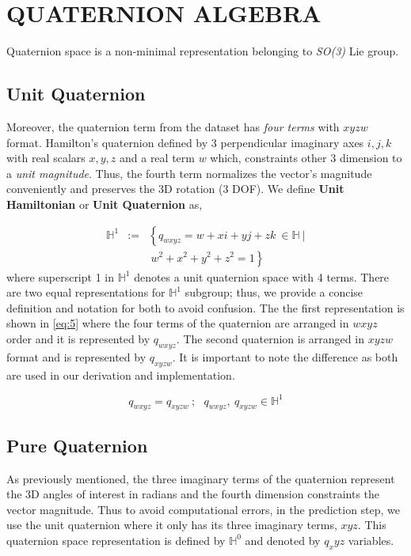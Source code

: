 \documentclass[letterpaper, 10 pt, conference]{ieeeconf}  %
\begin{document}
\section{QUATERNION ALGEBRA} \label{sec:QuatAlg}

Quaternion space is a non-minimal representation belonging to \textit{SO(3)} Lie group.

\subsection{Unit Quaternion}
Moreover, the quaternion term from the dataset has \textit{four terms} with $xyzw$
format.
Hamilton's quaternion defined by 3 perpendicular imaginary axes $i,j,k$ with
real scalars $x,y,z$ and a real term $w$ which, constraints other 3 dimension to
a \textit{unit magnitude}. Thus, the fourth term normalizes the vector's magnitude
conveniently and preserves the 3D rotation (3 DOF). We define \textbf{Unit Hamiltonian}
or \textbf{Unit Quaternion} as,


\begin{eqnarray}\nonumber
\label{eq:9}
\mathbb{H}^{1} &:=&\left\{ q_{wxyz}=w+xi+yj+zk~\in \mathbb{H}~| \right.\\
                   && \left.~w^{2}+x^{2}+y^{2}+z^{2}=1 \right\}
\end{eqnarray}
\noindent
where superscript 1 in $\mathbb{H}^{1}$ denotes a unit quaternion space with 4
terms. There are two equal representations for $\mathbb{H}^{1}$ subgroup; thus,
we provide a concise definition and notation for both to avoid confusion. The
the first representation is shown in \ref{eq:5} where the four terms of the
quaternion are arranged in $wxyz$ order and it is represented by $q_{wxyz}$.
The second quaternion is arranged in $xyzw$ format and is represented by $q_{xyzw}$.
It is important to note the difference as both are used in our derivation and
implementation.

\begin{equation}
\label{eq:12}
q_{wxyz} = q_{xyzw} ~; ~~~ q_{wxyz},~q_{xyzw} \in \mathbb{H}^{1}
\end{equation}


\subsection{Pure Quaternion}
As previously mentioned, the three imaginary terms of the quaternion represent the
3D angles of interest in radians and the fourth dimension constraints the vector
magnitude. Thus to avoid computational errors, in the prediction step, we use
the unit quaternion where it only has its three imaginary terms, $xyz$.
This quaternion space representation is defined by $\mathbb{H}^{0}$ and
denoted by $q_xyz$ variables.
\end{document}
